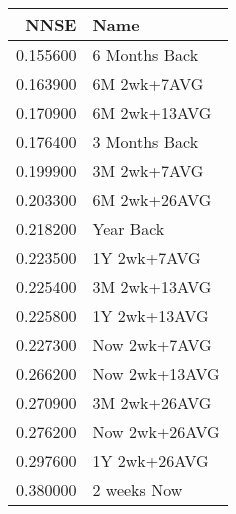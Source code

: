 \begin{tabular}{rl}
NNSE & Name \\
\hline
0.155600 & 6 Months Back \\
0.163900 & 6M 2wk+7AVG \\
0.170900 & 6M 2wk+13AVG \\
0.176400 & 3 Months Back \\
0.199900 & 3M 2wk+7AVG \\
0.203300 & 6M 2wk+26AVG \\
0.218200 & Year Back \\
0.223500 & 1Y 2wk+7AVG \\
0.225400 & 3M 2wk+13AVG \\
0.225800 & 1Y 2wk+13AVG \\
0.227300 & Now 2wk+7AVG \\
0.266200 & Now 2wk+13AVG \\
0.270900 & 3M 2wk+26AVG \\
0.276200 & Now 2wk+26AVG \\
0.297600 & 1Y 2wk+26AVG \\
0.380000 & 2 weeks Now \\
\hline
\end{tabular}